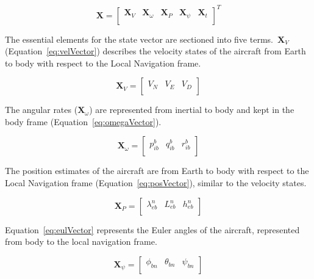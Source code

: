 \begin{equation}\label{eq:stateVector}
    \mathbf{X} =
    \begin{bmatrix}
        \mathbf{X}_V & \mathbf{X}_{\omega} & \mathbf{X}_P & \mathbf{X}_{\psi} & \mathbf{X}_t \\
    \end{bmatrix}^T
\end{equation}

The essential elements for the state vector are sectioned into five terms.~\(\mathbf{X}_V\) (Equation~\ref{eq:velVector}) describes the velocity states of the aircraft from Earth to body with respect to the Local Navigation frame.

\begin{equation}\label{eq:velVector}
    \mathbf{X}_V =
    \begin{bmatrix}
        V_N & V_E & V_D \\
    \end{bmatrix}
\end{equation}

The angular rates (\(\mathbf{X}_{\omega}\)) are represented from inertial to body and kept in the body frame (Equation~\ref{eq:omegaVector}).

\begin{equation}\label{eq:omegaVector}
    \mathbf{X}_{\omega} =
    \begin{bmatrix}
        p_{ib}^b & q_{ib}^b & r_{ib}^b \\
    \end{bmatrix}
\end{equation}

The position estimates of the aircraft are from Earth to body with respect to the Local Navigation frame (Equation~\ref{eq:posVector}), similar to the velocity states.

\begin{equation}\label{eq:posVector}
    \mathbf{X}_P =
    \begin{bmatrix}
        \lambda_{eb}^n & L_{eb}^n & h_{eb}^n \\
    \end{bmatrix}
\end{equation}

Equation~\ref{eq:eulVector} represents the Euler angles of the aircraft, represented from body to the local navigation frame.

\begin{equation}\label{eq:eulVector}
    \mathbf{X}_{\psi} =
    \begin{bmatrix}
        \phi_{bn} & \theta_{bn} & \psi_{bn} \\
    \end{bmatrix}
\end{equation}


